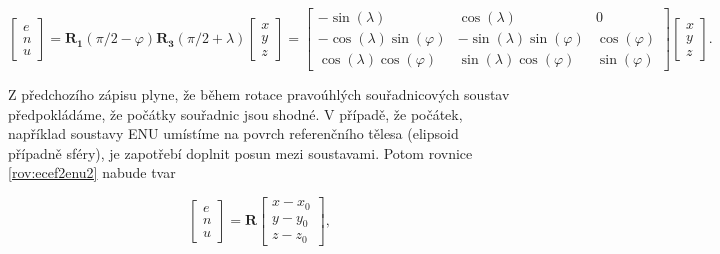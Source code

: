 \begin{equation}
\begin{bmatrix}
e \\
n \\
u
\end{bmatrix} =
\mathbf{R_{1}}\left(\pi/2-\varphi\right)\mathbf{R_{3}}\left(\pi/2+\lambda\right)
\begin{bmatrix}
x \\
y \\
z
\end{bmatrix} =
\begin{bmatrix}
-\sin{\left(\lambda\right)} & \cos{\left(\lambda\right)} & 0 \\
-\cos{\left(\lambda\right)}\sin{\left(\varphi\right)} & -\sin{\left(\lambda\right)}\sin{\left(\varphi\right)} & \cos{\left(\varphi\right)} \\
\cos{\left(\lambda\right)}\cos{\left(\varphi\right)} & \sin{\left(\lambda\right)}\cos{\left(\varphi\right)} & \sin{\left(\varphi\right)}
\end{bmatrix}
\begin{bmatrix}
x \\
y \\
z
\end{bmatrix}.
\label{rov:ecef2enu2}
\end{equation}

Z předchozího zápisu plyne, že během rotace pravoúhlých souřadnicových soustav předpokládáme, že počátky souřadnic jsou shodné. V případě, že počátek, například soustavy ENU umístíme na povrch referenčního tělesa (elipsoid případně sféry), je zapotřebí doplnit posun mezi soustavami. Potom rovnice \ref{rov:ecef2enu2} nabude tvar

\begin{equation}
\begin{bmatrix}
e \\
n \\
u
\end{bmatrix} =
\mathbf{R}
\begin{bmatrix}
x - x_{0} \\
y - y_{0} \\
z - z_{0}
\end{bmatrix},
\label{rov:ecef2enu22}
\end{equation}

